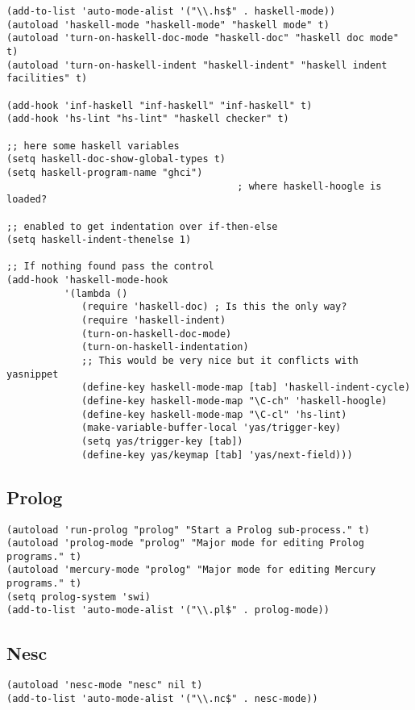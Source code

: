 \documentclass[11pt]{article}
\begin{document}
\begin{verbatim}
(add-to-list 'auto-mode-alist '("\\.hs$" . haskell-mode))
(autoload 'haskell-mode "haskell-mode" "haskell mode" t)
(autoload 'turn-on-haskell-doc-mode "haskell-doc" "haskell doc mode" t)
(autoload 'turn-on-haskell-indent "haskell-indent" "haskell indent facilities" t)

(add-hook 'inf-haskell "inf-haskell" "inf-haskell" t)
(add-hook 'hs-lint "hs-lint" "haskell checker" t)

;; here some haskell variables
(setq haskell-doc-show-global-types t)
(setq haskell-program-name "ghci")
                                        ; where haskell-hoogle is loaded?

;; enabled to get indentation over if-then-else
(setq haskell-indent-thenelse 1)

;; If nothing found pass the control
(add-hook 'haskell-mode-hook
          '(lambda ()
             (require 'haskell-doc) ; Is this the only way?
             (require 'haskell-indent)
             (turn-on-haskell-doc-mode)
             (turn-on-haskell-indentation)
             ;; This would be very nice but it conflicts with yasnippet
             (define-key haskell-mode-map [tab] 'haskell-indent-cycle)
             (define-key haskell-mode-map "\C-ch" 'haskell-hoogle)
             (define-key haskell-mode-map "\C-cl" 'hs-lint)
             (make-variable-buffer-local 'yas/trigger-key)
             (setq yas/trigger-key [tab])
             (define-key yas/keymap [tab] 'yas/next-field)))
\end{verbatim}
\subsection{Prolog}
\label{sec-31.7}

\begin{verbatim}
(autoload 'run-prolog "prolog" "Start a Prolog sub-process." t)
(autoload 'prolog-mode "prolog" "Major mode for editing Prolog programs." t)
(autoload 'mercury-mode "prolog" "Major mode for editing Mercury programs." t)
(setq prolog-system 'swi)
(add-to-list 'auto-mode-alist '("\\.pl$" . prolog-mode))
\end{verbatim}
\subsection{Nesc}
\label{sec-31.8}

\begin{verbatim}
(autoload 'nesc-mode "nesc" nil t)
(add-to-list 'auto-mode-alist '("\\.nc$" . nesc-mode))
\end{verbatim}
\end{document}
